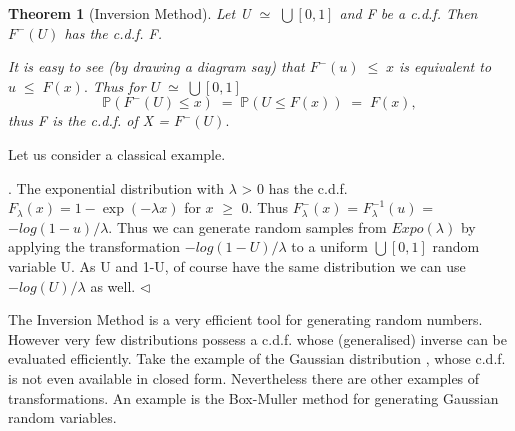 \documentclass[a4paper,10pt]{article}
\newtheorem{theorem}{Theorem}[section]
\newenvironment{proof}[1][Proof]{\begin{trivlist}
\item[\hskip \labelsep {\bfseries #1}]}{\end{trivlist}}
\newenvironment{example}[1][Example]{\begin{trivlist}
\item[\hskip \labelsep {\bfseries #1}]}{\end{trivlist}}
\begin{document}
   \begin{theorem}[Inversion Method] Let U $\simeq$ $\bigcup[0,1]$ and F be a c.d.f. Then $F^{-}(U)$ has the c.d.f. F.
    \begin{proof}
     It is easy to see (by drawing a diagram say) that $F^{-}(u) \;\leq\;x$ is equivalent to $u \; \leq\; F(x).$
     Thus for $U\;\simeq\;\bigcup[0,1]$
   \newline
   \begin{displaymath}
    \mathbb{P}(F^{-}(U) \leq x)\;=\;\mathbb{P}(U\leq F(x))\;=\;F(x),
   \end{displaymath}
thus F is the c.d.f. of X = $F^{-}(U).$

    \end{proof}

   \end{theorem}
Let us consider a classical example.
\begin{example}[Exponential Distribution].\label{3.1}
The exponential distribution with $\lambda$ > 0 has the c.d.f. $F_{\lambda}(x)= 1 - \exp(-\lambda x)$ for $x$ $\geq$ 0.
Thus $F^{-}_{\lambda}(x)$ = $F^{-1}_{\lambda}(u)$ = $-log(1 - u)/ \lambda$. Thus we can generate random samples from 
$Expo(\lambda)$ by applying the transformation $-log(1-U)/ \lambda$ to a uniform $\bigcup[0,1]$ random variable U. As
U and 1-U, of course have the same distribution we can use $-log(U)/ \lambda$ as well.       \quad\quad$\triangleleft$
 
\end{example}
  The Inversion Method is a very efficient tool for generating random numbers. However very few distributions 
  possess a c.d.f. whose (generalised) inverse can be evaluated efficiently. Take the example of the Gaussian distribution
  , whose c.d.f. is not even available in closed form. 
     Nevertheless there are other examples of transformations. An example is the Box-Muller method for
     generating Gaussian random variables.
\end{document}
